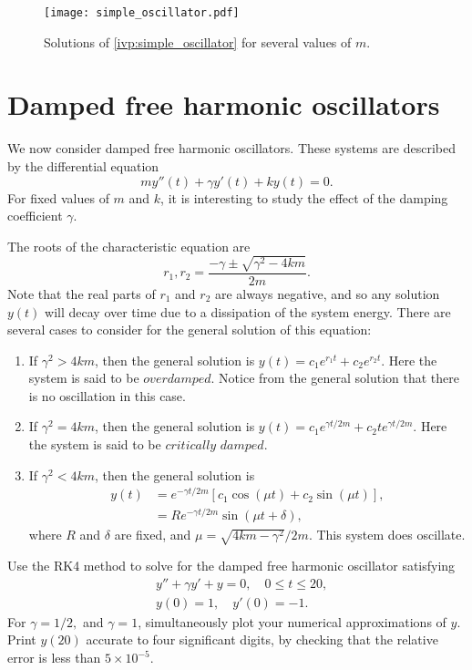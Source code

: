 \begin{figure}[ht]
\centering
\texttt{[image: simple\_oscillator.pdf]}
\caption{Solutions of \eqref{ivp:simple_oscillator} for several values of $m$.}
\label{ivp:simple_oscillator_figure}
\end{figure}


\section*{Damped free harmonic oscillators} 
We now consider damped free harmonic oscillators. 
These systems are described by the differential equation
\[my''(t) +\gamma y'(t) + ky(t) = 0.\]
For fixed values of $m$ and $k$, it is interesting to study the effect of the damping coefficient $\gamma$.

The roots of the characteristic equation are \[r_1,r_2 = \frac{-\gamma \pm \sqrt{\gamma^2 -4km}}{2m} .\]
Note that the real parts of $r_1$ and $r_2$ are always negative, and so any solution $y(t)$ will decay over time due to a dissipation of the system energy. 
There are several cases to consider for the general solution of this equation:
\begin{enumerate}
\item If $\gamma^2 > 4km$, then the general solution is $y(t) = c_1 e^{r_1t} + c_2e^{r_2t}$. Here the system is said to be $\textit{overdamped}$. 
Notice from the general solution that there is no oscillation in this case.
\item If $\gamma^2 = 4km$, then the general solution is $y(t) = c_1 e^{\gamma t/2m} + c_2 te^{\gamma t/2m}$. Here the system is said to be $\textit{critically damped}$.
\item If $\gamma^2 < 4km$, then the general solution is
\begin{align*}
y(t) &= e^{-\gamma t/2m} \left[c_1\cos(\mu t) + c_2 \sin (\mu t)\right],\\
&= R e^{-\gamma t/2m}  \sin (\mu t + \delta),
\end{align*}
where $R$ and $\delta$ are fixed, and $\mu = \sqrt{4km-\gamma^2}/2m.$ This system does oscillate.
\end{enumerate}

\begin{problem}
Use the RK4 method to solve for the damped free harmonic oscillator satisfying 
\begin{align*}
&{}y'' +\gamma y'+ y = 0, \quad 0 \leq t \leq 20,\\
&{}y(0) = 1, \quad
y'(0) = -1.
\end{align*}
For $\gamma = 1/2,$ and $\gamma = 1$, simultaneously plot your numerical approximations of $y$.  
Print $y(20)$ accurate to four significant digits, by checking that the relative error is less than $5\times 10^{-5}$.
\end{problem}

